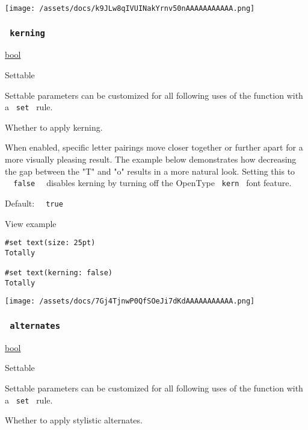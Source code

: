 \texttt{[image: /assets/docs/k9JLw8qIVUINakYrnv50nAAAAAAAAAAA.png]}

\subsubsection{\texorpdfstring{\texttt{\ kerning\ }}{ kerning }}\label{parameters-kerning}

\href{/docs/reference/foundations/bool/}{bool}

{{ Settable }}

\label{parameters-kerning-settable-tooltip}
Settable parameters can be customized for all following uses of the
function with a \texttt{\ set\ } rule.

Whether to apply kerning.

When enabled, specific letter pairings move closer together or further
apart for a more visually pleasing result. The example below
demonstrates how decreasing the gap between the "T" and "o" results in a
more natural look. Setting this to
\texttt{\ }{\texttt{\ false\ }}\texttt{\ } disables kerning by turning
off the OpenType \texttt{\ kern\ } font feature.

Default: \texttt{\ }{\texttt{\ true\ }}\texttt{\ }


View example

\begin{verbatim}
#set text(size: 25pt)
Totally

#set text(kerning: false)
Totally
\end{verbatim}

\texttt{[image: /assets/docs/7Gj4TjnwP0QfSOeJi7dKdAAAAAAAAAAA.png]}

\subsubsection{\texorpdfstring{\texttt{\ alternates\ }}{ alternates }}\label{parameters-alternates}

\href{/docs/reference/foundations/bool/}{bool}

{{ Settable }}

\label{parameters-alternates-settable-tooltip}
Settable parameters can be customized for all following uses of the
function with a \texttt{\ set\ } rule.

Whether to apply stylistic alternates.

